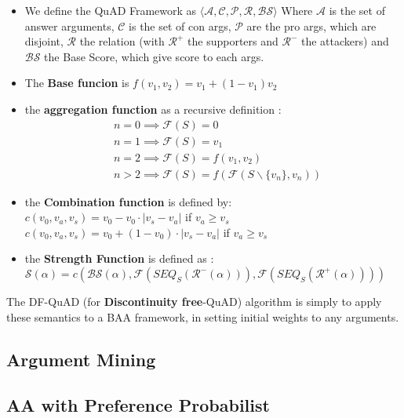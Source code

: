 			\begin{definition}
				\begin{itemize}
					\item We define the QuAD Framework as $\langle \mathcal{A}, \mathcal{C}, \mathcal{P}, \mathcal{R}, \mathcal{BS}\rangle $ Where $\mathcal{A}$ is the set of answer arguments, $\mathcal{C}$ is the set of con args, $\mathcal{P}$ are the pro args, which are disjoint, $\mathcal{R}$ the relation (with $\mathcal{R}^+$ the supporters and $\mathcal{R}^-$ the attackers) and $\mathcal{BS}$ the Base Score, which give score to each args. 
					\item The \textbf{Base funcion} is $f(v_1, v_2) = v_1 + (1-v_1)v_2$
					\item the \textbf{aggregation function} as a recursive definition : 
					\begin{align*}
						& n=0 \implies \mathcal{F}(S)=0\\
						& n=1 \implies \mathcal{F}(S)= v_1\\
						& n=2 \implies \mathcal{F}(S)= f(v_1, v_2)\\
						& n>2 \implies \mathcal{F}(S)= f(\mathcal{F}(S\backslash \{v_n\}, v_n))
					\end{align*}
					\item the \textbf{Combination function} is defined by: \\
					$c(v_0, v_a, v_s) = v_0 - v_0 \cdot |v_s-v_a|$ if $v_a \geq v_s$\\
					$c(v_0, v_a, v_s) = v_0 + (1 - v_0 ) \cdot |v_s-v_a|$ if $v_a \geq v_s$
					\item the \textbf{Strength Function} is defined as : $\mathcal{S}(\alpha) = c(\mathcal{BS}(\alpha), \mathcal{F}(SEQ_S(\mathcal{R}^-(\alpha))), \mathcal{F}(SEQ_S(\mathcal{R}^+(\alpha))))$
				\end{itemize}
			\end{definition}

			The DF-QuAD (for \textbf{Discontinuity free}-QuAD) algorithm is simply to apply these semantics to a BAA framework, in setting initial weights to any arguments. 


	\subsection{Argument Mining}
	\subsection{AA with Preference Probabilist}

